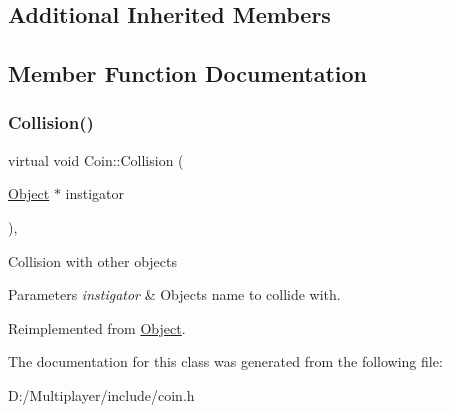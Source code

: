 \subsection*{Additional Inherited Members}


\subsection{Member Function Documentation}
\mbox{\label{class_coin_aa6b47cadab21693854c2c4f8266a5ac1}} 
\subsubsection{\texorpdfstring{Collision()}{Collision()}}
{\footnotesize\ttfamily virtual void Coin\+::\+Collision (\begin{DoxyParamCaption}\item[{\hyperlink{class_object}{Object} $\ast$}]{instigator }\end{DoxyParamCaption})\hspace{0.3cm}{\ttfamily [override]}, {\ttfamily [virtual]}}

Collision with other objects 
\begin{DoxyParams}{Parameters}
{\em instigator} & Objects name to collide with. \\
\hline
\end{DoxyParams}


Reimplemented from \hyperlink{class_object_a0af60ea226dcb885e69483452d34a47a}{Object}.



The documentation for this class was generated from the following file\+:\begin{DoxyCompactItemize}
\item 
D\+:/\+Multiplayer/include/coin.\+h\end{DoxyCompactItemize}
